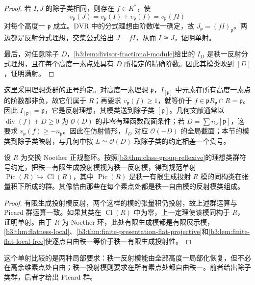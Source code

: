 \begin{proof}
	若 \(I,J\) 的除子类相同，则存在 \(f\in K^*\)，使
	\[
		v_{\mathfrak p}(J)=v_{\mathfrak p}(I)+v_{\mathfrak p}(f) =v_{\mathfrak p}(fI)
	\]
	对每个高度一 \(\mathfrak p\) 成立。DVR 中的分式理想由阶数唯一确定，故 \(J_{\mathfrak p}=(fI)_{\mathfrak p}\)。两边都是反射分式理想，交集公式给出 \(J=fI\)，从而 \(I\cong J\)，证明单射。

	最后，对任意除子 \(D\)，\cref{b3:lem:divisor-fractional-module}给出的 \(I_D\) 是秩一反射分式理想，且在每个高度一素点处具有 \(D\) 所指定的精确阶数。因此其模类映到 \([D]\)，证明满射。
\end{proof}

这里采用理想类群的正号约定。对高度一素理想 \(\mathfrak p\)，\(I_{[\mathfrak p]}\) 中元素在所有高度一素点的阶数都非负，故它们属于 \(R\)；再要求 \(v_{\mathfrak p}(f)\ge1\)，就等价于 \(f\in\mathfrak pR_{\mathfrak p}\cap R=\mathfrak p\)。因此 \(I_{[\mathfrak p]}=\mathfrak p\)，它是反射理想，其模类送到除子类 \([\mathfrak p]\)。几何文献通常以 \(\operatorname{div}(f)+D\ge0\) 为 \(\mathcal O(D)\) 的非零有理函数截面条件；若 \(D=\sum n_{\mathfrak p}[\mathfrak p]\)，这要求 \(v_{\mathfrak p}(f)\ge-n_{\mathfrak p}\)。因此在仿射情形，\(I_D\) 对应 \(\mathcal O(-D)\) 的全局截面；本节的模类到除子类映射，与几何中按 \(L\simeq\mathcal O(D)\) 取除子类的约定相差一个负号\cite[Chapter II, \S6, pp. 144--145]{Hartshorne1977}。

\begin{proposition}\label{b3:prop:picard-class-group}
	设 \(R\) 为交换 Noether 正规整环。按照\cref{b3:thm:class-group-reflexive}的理想类群符号约定，把秩一有限生成投射模视为秩一反射模，得到规范单射 \(\operatorname{Pic}(R)\hookrightarrow\operatorname{Cl}(R)\)，其中 \(\operatorname{Pic}(R)\) 是秩一有限生成投射 \(R\) 模的同构类在张量积下所成的群。其像恰由那些在每个素点处都是秩一自由模的反射模类组成。
\end{proposition}
\begin{proof}
	有限生成投射模反射，两个这样的模的张量积仍投射，故上述群运算与 Picard 群运算一致。如果其类在 \(\operatorname{Cl}(R)\) 中为零，上一定理使该模同构于 \(R\)，证明单射。由于 \(R\) 为 Noether 环，此处有限生成模都是有限展示模，\cref{b3:thm:flatness-local}、\cref{b3:thm:finite-presentation-flat-projective}和\cref{b3:lem:finite-flat-local-free}使逐点自由秩一等价于秩一有限生成投射性。
\end{proof}

这个单射比较的是两种局部要求：秩一反射模能由全部高度一局部化恢复，但不必在高余维素点处自由；秩一投射模则要求在所有素点处都自由秩一。前者给出除子类群，后者才给出 Picard 群。

